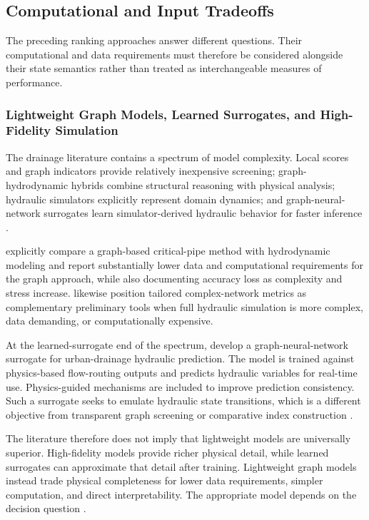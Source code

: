 \subsection{Computational and Input Tradeoffs}
The preceding ranking approaches answer different questions. Their
computational and data requirements must therefore be considered alongside
their state semantics rather than treated as interchangeable measures of
performance.

\subsubsection{Lightweight Graph Models, Learned Surrogates, and
High-Fidelity
Simulation}\label{lightweight-graph-models-learned-surrogates-and-high-fidelity-simulation}

The drainage literature contains a spectrum of model complexity. Local
scores and graph indicators provide relatively inexpensive screening;
graph-hydrodynamic hybrids combine structural reasoning with physical
analysis; hydraulic simulators explicitly represent domain dynamics; and
graph-neural-network surrogates learn simulator-derived hydraulic
behavior for faster inference \citep{simone2022,dastgir2023,meijer2023,
zhang2024}.

\citet{dastgir2023} explicitly compare a graph-based critical-pipe
method with hydrodynamic modeling and report substantially lower data
and computational requirements for the graph approach, while also
documenting accuracy loss as complexity and stress increase. \citet{simone2022}
likewise position tailored complex-network metrics as
complementary preliminary tools when full hydraulic simulation is more
complex, data demanding, or computationally expensive.

At the learned-surrogate end of the spectrum, \citet{zhang2024}
develop a graph-neural-network surrogate for urban-drainage hydraulic
prediction. The model is trained against physics-based flow-routing
outputs and predicts hydraulic variables for real-time use.
Physics-guided mechanisms are included to improve prediction
consistency. Such a surrogate seeks to emulate hydraulic state transitions,
which is a different objective from transparent graph screening or
comparative index construction \citep{zhang2024}.

The literature therefore does not imply that lightweight models are
universally superior. High-fidelity models provide richer physical
detail, while learned surrogates can approximate that detail after
training. Lightweight graph models instead trade physical completeness
for lower data requirements, simpler computation, and direct
interpretability. The appropriate model depends on the decision
question \citep{dastgir2023,simone2022,zhang2024}.

